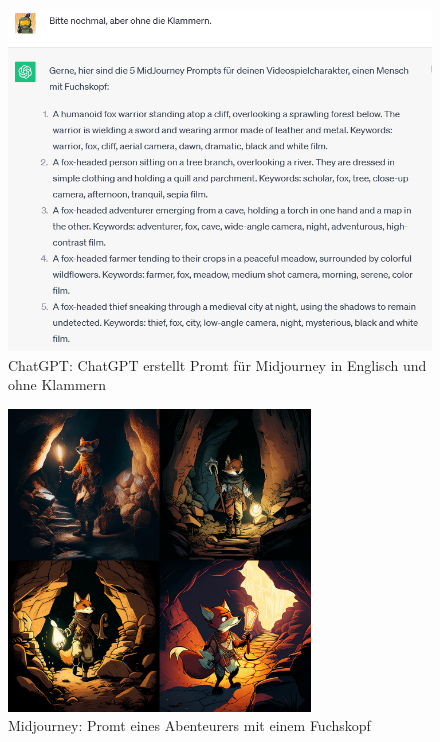 \documentclass[10pt,a4paper,bibliography=totocnumbered,listof=totocnumbered]{scrartcl}
\begin{document}
\begin{figure}
	\centering
	\includegraphics[scale=0.7]{BilderFuerBA/CGPTMidJourneyMartinLuther/06.png}
	\caption{ChatGPT: ChatGPT erstellt Promt für Midjourney in Englisch und ohne Klammern}
	\label{chatgpt_mj-formel_ohne_Klammern}
\end{figure}

\begin{figure}
	\centering
	\includegraphics[width=8.022cm]{BilderFuerBA/Sonstiges/fuchsKopfAbenteuerer.png}
	\caption{Midjourney: Promt eines Abenteurers mit einem Fuchskopf}
	\label{MidjourneyFuchsKopfAbenteuerer}
\end{figure}
\end{document}
